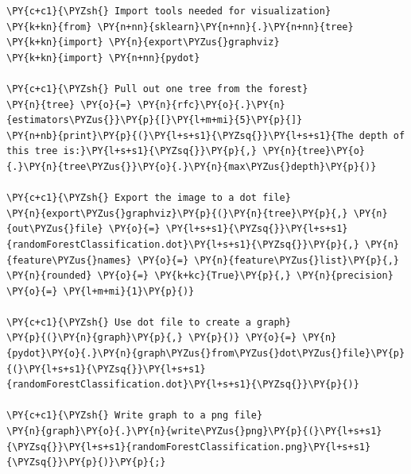     \begin{tcolorbox}[breakable, size=fbox, boxrule=1pt, pad at break*=1mm,colback=cellbackground, colframe=cellborder]
\begin{Verbatim}[commandchars=\\\{\}]
\PY{c+c1}{\PYZsh{} Import tools needed for visualization}
\PY{k+kn}{from} \PY{n+nn}{sklearn}\PY{n+nn}{.}\PY{n+nn}{tree} \PY{k+kn}{import} \PY{n}{export\PYZus{}graphviz}
\PY{k+kn}{import} \PY{n+nn}{pydot}

\PY{c+c1}{\PYZsh{} Pull out one tree from the forest}
\PY{n}{tree} \PY{o}{=} \PY{n}{rfc}\PY{o}{.}\PY{n}{estimators\PYZus{}}\PY{p}{[}\PY{l+m+mi}{5}\PY{p}{]}
\PY{n+nb}{print}\PY{p}{(}\PY{l+s+s1}{\PYZsq{}}\PY{l+s+s1}{The depth of this tree is:}\PY{l+s+s1}{\PYZsq{}}\PY{p}{,} \PY{n}{tree}\PY{o}{.}\PY{n}{tree\PYZus{}}\PY{o}{.}\PY{n}{max\PYZus{}depth}\PY{p}{)}

\PY{c+c1}{\PYZsh{} Export the image to a dot file}
\PY{n}{export\PYZus{}graphviz}\PY{p}{(}\PY{n}{tree}\PY{p}{,} \PY{n}{out\PYZus{}file} \PY{o}{=} \PY{l+s+s1}{\PYZsq{}}\PY{l+s+s1}{randomForestClassification.dot}\PY{l+s+s1}{\PYZsq{}}\PY{p}{,} \PY{n}{feature\PYZus{}names} \PY{o}{=} \PY{n}{feature\PYZus{}list}\PY{p}{,} \PY{n}{rounded} \PY{o}{=} \PY{k+kc}{True}\PY{p}{,} \PY{n}{precision} \PY{o}{=} \PY{l+m+mi}{1}\PY{p}{)}

\PY{c+c1}{\PYZsh{} Use dot file to create a graph}
\PY{p}{(}\PY{n}{graph}\PY{p}{,} \PY{p}{)} \PY{o}{=} \PY{n}{pydot}\PY{o}{.}\PY{n}{graph\PYZus{}from\PYZus{}dot\PYZus{}file}\PY{p}{(}\PY{l+s+s1}{\PYZsq{}}\PY{l+s+s1}{randomForestClassification.dot}\PY{l+s+s1}{\PYZsq{}}\PY{p}{)}

\PY{c+c1}{\PYZsh{} Write graph to a png file}
\PY{n}{graph}\PY{o}{.}\PY{n}{write\PYZus{}png}\PY{p}{(}\PY{l+s+s1}{\PYZsq{}}\PY{l+s+s1}{randomForestClassification.png}\PY{l+s+s1}{\PYZsq{}}\PY{p}{)}\PY{p}{;} 
\end{Verbatim}
\end{tcolorbox}


